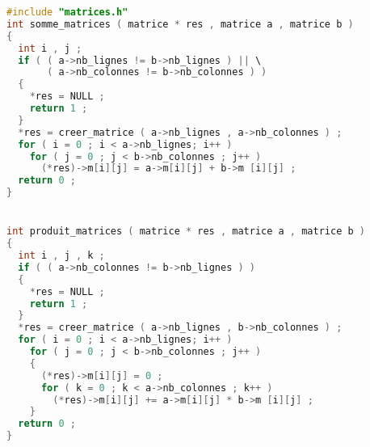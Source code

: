 \begin{solution}
  \begin{lstlisting}[language=C]
#include "matrices.h"
int somme_matrices ( matrice * res , matrice a , matrice b )
{
  int i , j ;
  if ( ( a->nb_lignes != b->nb_lignes ) || \
       ( a->nb_colonnes != b->nb_colonnes ) )
  {
    *res = NULL ;
    return 1 ;
  }
  *res = creer_matrice ( a->nb_lignes , a->nb_colonnes ) ;
  for ( i = 0 ; i < a->nb_lignes; i++ )
    for ( j = 0 ; j < b->nb_colonnes ; j++ )
      (*res)->m[i][j] = a->m[i][j] + b->m [i][j] ;
  return 0 ;
}


int produit_matrices ( matrice * res , matrice a , matrice b )
{
  int i , j , k ;
  if ( ( a->nb_colonnes != b->nb_lignes ) )
  {
    *res = NULL ;
    return 1 ;
  }
  *res = creer_matrice ( a->nb_lignes , b->nb_colonnes ) ;
  for ( i = 0 ; i < a->nb_lignes; i++ )
    for ( j = 0 ; j < b->nb_colonnes ; j++ )
    {
      (*res)->m[i][j] = 0 ;
      for ( k = 0 ; k < a->nb_colonnes ; k++ )
        (*res)->m[i][j] += a->m[i][j] * b->m [i][j] ;
    }
  return 0 ;
}
  \end{lstlisting}
\end{solution}